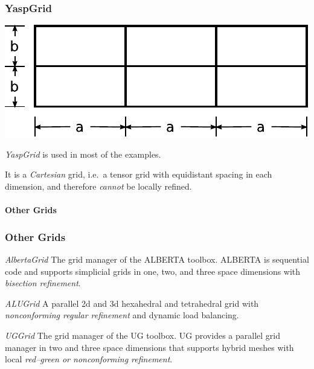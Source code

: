 \begin{frame}
  \frametitle<presentation>{YaspGrid}
  \begin{center}
    \includegraphics{EPS/adaptivity/cartesian}
  \end{center}
  \begin{block}{\emph{YaspGrid}}
    is used in most of the examples.

    It is a \emph{Cartesian} grid, i.e.~a tensor grid with equidistant spacing in each dimension, and therefore \emph{cannot} be locally refined.
  \end{block}
\end{frame}

\paragraph{Other Grids}

\begin{frame}
  \frametitle<presentation>{Other Grids}

  \begin{block}{\emph{AlbertaGrid}}
    The grid manager of the ALBERTA toolbox. 
    ALBERTA is sequential code and supports simplicial grids in one, two, and 
    three space dimensions with \emph{bisection refinement}.

  \end{block}

  \begin{block}{\emph{ALUGrid}}
    A parallel 2d and 3d hexahedral and tetrahedral grid with \emph{nonconforming regular refinement} and dynamic load balancing.

  \end{block}

  \begin{block}{\emph{UGGrid}}
    The grid manager of the UG toolbox.
    UG provides a parallel grid manager in two and three space dimensions 
    that supports hybrid meshes with local \emph{red--green or nonconforming 
    refinement}.


  \end{block}
\end{frame}


